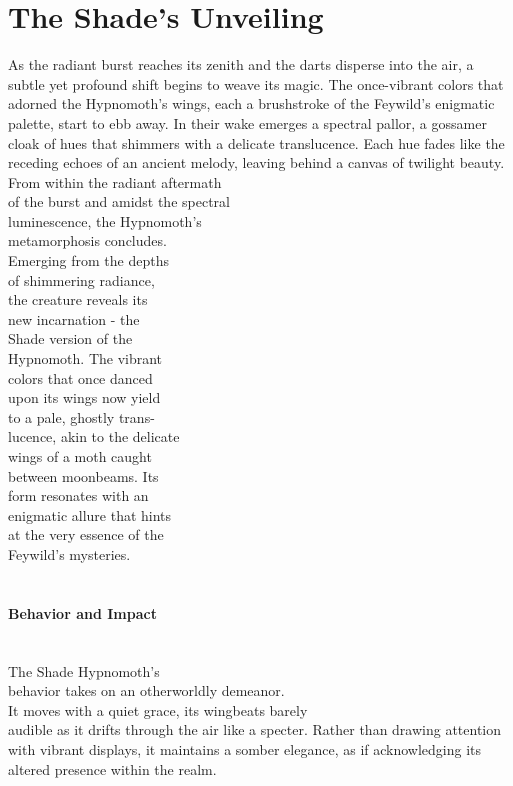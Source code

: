\section*{The Shade's Unveiling}
As the radiant burst reaches its zenith and the darts disperse into the air, a subtle yet profound shift begins to weave its magic. The once-vibrant colors that adorned the Hypnomoth's wings, each a brushstroke of the Feywild's enigmatic palette, start to ebb away. In their wake emerges a spectral pallor, a gossamer cloak of hues that shimmers with a delicate translucence. Each hue fades like the receding echoes of an ancient melody, leaving behind a canvas of twilight beauty.
\vfill\eject
\noindent From within the radiant aftermath\\of the burst and amidst the spectral\\luminescence, the Hypnomoth's\\metamorphosis concludes.\\Emerging from the depths\\of shimmering radiance,\\the creature reveals its\\new incarnation - the\\Shade version of the\\Hypnomoth. The vibrant\\colors that once danced\\upon its wings now yield\\to a pale, ghostly trans-\\lucence, akin to the delicate\\wings of a moth caught\\between moonbeams. Its\\form resonates with an\\enigmatic allure that hints\\at the very essence of the\\Feywild's mysteries.
\\\\
\paragraph*{Behavior and Impact}\hfill\\
The Shade Hypnomoth's\\behavior takes on an otherworldly demeanor.\\It moves with a quiet grace, its wingbeats barely\\audible as it drifts through the air like a specter. Rather than drawing attention with vibrant displays, it maintains a somber elegance, as if acknowledging its altered presence within the realm.

